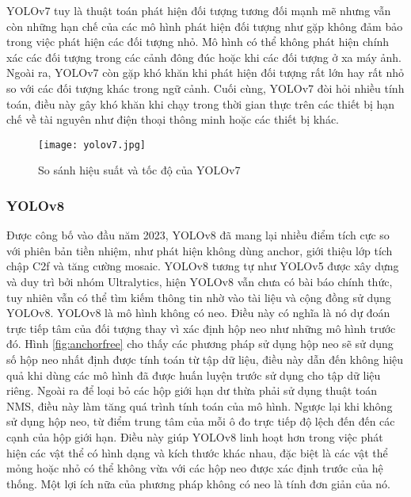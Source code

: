 \documentclass[../the.tex]{subfiles}
\begin{document}
{\fontsize{13}{12} \selectfont

YOLOv7 tuy là thuật toán phát hiện đối tượng tương đối mạnh mẽ nhưng vẫn còn những hạn chế của các mô hình phát hiện đối tượng như gặp không đảm bảo trong việc phát hiện các đối tượng nhỏ. Mô hình có thể không phát hiện chính xác các đối tượng trong các cảnh đông đúc hoặc khi các đối tượng ở xa máy ảnh.
Ngoài ra, YOLOv7 còn gặp khó khăn khi phát hiện đối tượng rất lớn hay rất nhỏ so với các đối tượng khác trong ngữ cảnh. Cuối cùng, YOLOv7 đòi hỏi nhiều tính toán, điều này gây khó khăn khi chạy trong thời gian thực trên các thiết bị hạn chế về tài nguyên như điện thoại thông minh hoặc các thiết bị
khác.

}

\begin{figure}[H]
	\centering
	\texttt{[image: yolov7.jpg]}
	\caption{So sánh hiệu suất và tốc độ của YOLOv7 \cite{wang2022yolov7}}
	\label{fig:yolov7}
\end{figure}

\subsubsection{YOLOv8}
\label{sec:yolov8}
{\fontsize{13}{12} \selectfont

	Được công bố vào đầu năm 2023, YOLOv8 \cite{YOLOv8} đã mang lại nhiều điểm tích cực so với phiên bản tiền nhiệm, như phát hiện không dùng anchor, giới thiệu lớp tích chập C2f và tăng cường mosaic.
	YOLOv8 tương tự như YOLOv5 được xây dựng và duy trì bởi nhóm Ultralytics, hiện YOLOv8 vẫn chưa có bài báo chính thức, tuy nhiên vẫn có thể tìm kiếm thông tin nhờ vào tài liệu và cộng đồng sử dụng YOLOv8.
	YOLOv8 là mô hình không có neo. Điều này có nghĩa là nó dự đoán trực tiếp tâm của đối tượng thay vì xác định hộp neo như những mô hình trước đó.
	Hình \ref{fig:anchorfree} cho thấy các phương pháp sử dụng hộp neo sẽ sử dụng số hộp neo nhất định được tính toán từ tập dữ liệu,
	điều này dẫn đến không hiệu quả khi dùng các mô hình đã được huấn luyện trước sử dụng cho tập dữ liệu riêng. Ngoài ra để loại bỏ các hộp giới hạn dư thừa phải sử dụng thuật toán NMS, điều này làm tăng quá trình tính toán của mô hình.
	Ngược lại khi không sử dụng hộp neo, từ điểm trung tâm của mỗi ô đo trực tiếp độ lệch đến đến các cạnh của hộp giới hạn.
	Điều này giúp YOLOv8 linh hoạt hơn trong việc phát hiện các vật thể có hình dạng và kích thước khác nhau, đặc biệt là các vật thể mỏng hoặc nhỏ có thể không vừa với các hộp neo được xác định trước của hệ thống.
	Một lợi ích nữa của phương pháp không có neo là tính đơn giản của nó.

}
\end{document}
